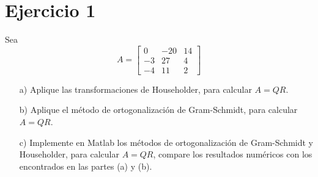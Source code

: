 
\section*{Ejercicio 1}
Sea
\[
A = \begin{bmatrix} 0 & -20 & 14 \\ -3 & 27 & 4 \\ -4 & 11 & 2 \end{bmatrix}
\]
\begin{enumerate}
    \item[a)] Aplique las transformaciones de Householder, para calcular $A = QR$.
    \item[b)] Aplique el método de ortogonalización de Gram-Schmidt, para calcular $A = QR$.
    \item[c)] Implemente en Matlab los métodos de ortogonalización de Gram-Schmidt y Householder, para calcular $A = QR$, compare los resultados numéricos con los encontrados en las partes (a) y (b).
\end{enumerate}